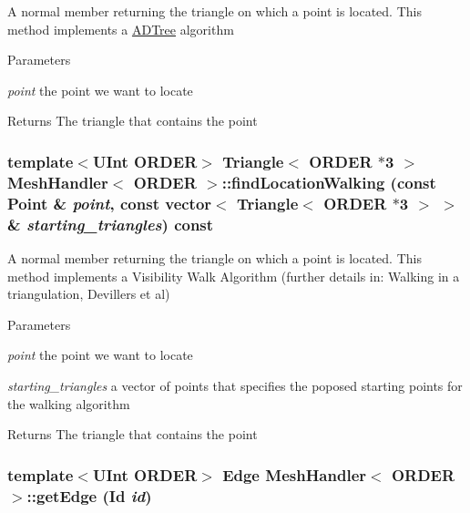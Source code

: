 A normal member returning the triangle on which a point is located. This method implements a \hyperlink{classADTree}{ADTree} algorithm 
\begin{DoxyParams}{Parameters}
\item[{\em point}]the point we want to locate \end{DoxyParams}
\begin{DoxyReturn}{Returns}
The triangle that contains the point 
\end{DoxyReturn}
\hypertarget{classMeshHandler_a0d4dfa615986d926bfff90432aee863b}{
\subsubsection[{findLocationWalking}]{\setlength{\rightskip}{0pt plus 5cm}template$<$UInt ORDER$>$ {\bf Triangle}$<$ ORDER $\ast$3 $>$ {\bf MeshHandler}$<$ ORDER $>$::findLocationWalking (const {\bf Point} \& {\em point}, \/  const vector$<$ {\bf Triangle}$<$ ORDER $\ast$3 $>$ $>$ \& {\em starting\_\-triangles}) const}}
\label{classMeshHandler_a0d4dfa615986d926bfff90432aee863b}


A normal member returning the triangle on which a point is located. This method implements a Visibility Walk Algorithm (further details in: Walking in a triangulation, Devillers et al) 
\begin{DoxyParams}{Parameters}
\item[{\em point}]the point we want to locate \item[{\em starting\_\-triangles}]a vector of points that specifies the poposed starting points for the walking algorithm \end{DoxyParams}
\begin{DoxyReturn}{Returns}
The triangle that contains the point 
\end{DoxyReturn}
\hypertarget{classMeshHandler_a346871cf4c2aa8082e81a76dd7ef5373}{
\subsubsection[{getEdge}]{\setlength{\rightskip}{0pt plus 5cm}template$<$UInt ORDER$>$ {\bf Edge} {\bf MeshHandler}$<$ ORDER $>$::getEdge (Id {\em id})}}
\label{classMeshHandler_a346871cf4c2aa8082e81a76dd7ef5373}


